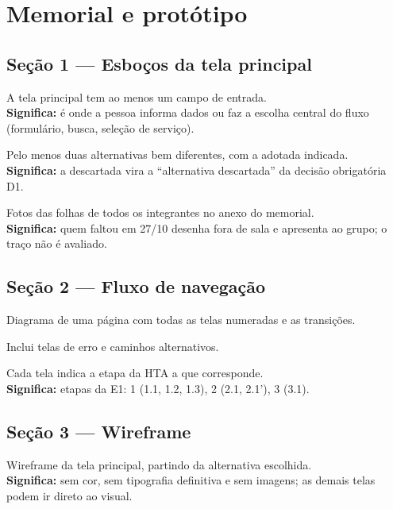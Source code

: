 \documentclass[11pt,a4paper]{article}
\newcommand{\obs}[1]{\\{\small\color{cinza}\textbf{Significa:} #1}}
\begin{document}
\section{Memorial e protótipo}

\subsection{Seção 1 --- Esboços da tela principal}
\begin{checks}
  \item A tela principal tem ao menos um campo de entrada.
    \obs{é onde a pessoa informa dados ou faz a escolha central do fluxo (formulário, busca, seleção de serviço).}
  \item Pelo menos duas alternativas bem diferentes, com a adotada indicada.
    \obs{a descartada vira a ``alternativa descartada'' da decisão obrigatória D1.}
  \item Fotos das folhas de todos os integrantes no anexo do memorial.
    \obs{quem faltou em 27/10 desenha fora de sala e apresenta ao grupo; o traço não é avaliado.}
\end{checks}

\subsection{Seção 2 --- Fluxo de navegação}
\begin{checks}
  \item Diagrama de uma página com todas as telas numeradas e as transições.
  \item Inclui telas de erro e caminhos alternativos.
  \item Cada tela indica a etapa da HTA a que corresponde.
    \obs{etapas da E1: 1 (1.1, 1.2, 1.3), 2 (2.1, 2.1'), 3 (3.1).}
\end{checks}

\subsection{Seção 3 --- Wireframe}
\begin{checks}
  \item Wireframe da tela principal, partindo da alternativa escolhida.
    \obs{sem cor, sem tipografia definitiva e sem imagens; as demais telas podem ir direto ao visual.}
\end{checks}
\end{document}
